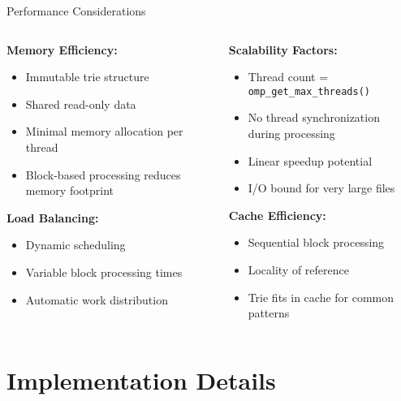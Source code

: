 \documentclass[aspectratio=169]{beamer}
\begin{document}
\begin{frame}{Performance Considerations}
\begin{columns}
\begin{column}{0.5\textwidth}
\textbf{Memory Efficiency:}
\begin{itemize}
    \item Immutable trie structure
    \item Shared read-only data
    \item Minimal memory allocation per thread
    \item Block-based processing reduces memory footprint
\end{itemize}

\vspace{0.3cm}
\textbf{Load Balancing:}
\begin{itemize}
    \item Dynamic scheduling
    \item Variable block processing times
    \item Automatic work distribution
\end{itemize}
\end{column}
\begin{column}{0.5\textwidth}
\textbf{Scalability Factors:}
\begin{itemize}
    \item Thread count = \texttt{omp\_get\_max\_threads()}
    \item No thread synchronization during processing
    \item Linear speedup potential
    \item I/O bound for very large files
\end{itemize}

\vspace{0.3cm}
\textbf{Cache Efficiency:}
\begin{itemize}
    \item Sequential block processing
    \item Locality of reference
    \item Trie fits in cache for common patterns
\end{itemize}
\end{column}
\end{columns}
\end{frame}

\section{Implementation Details}
\end{document}
